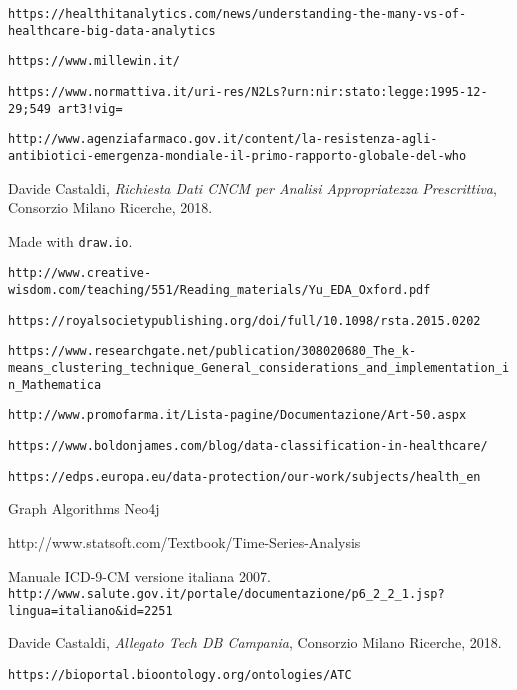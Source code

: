 \begin{thebibliography}{}
	\footnotesize
	
	\texttt{https://healthitanalytics.com/news/understanding-the-many-vs-of-healthcare-big-data-analytics}
	
	\texttt{https://www.millewin.it/}
	
	\texttt{https://www.normattiva.it/uri-res/N2Ls?urn:nir:stato:legge:1995-12-29;549~art3!vig=}
	
	\texttt{http://www.agenziafarmaco.gov.it/content/la-resistenza-agli-antibiotici-emergenza-mondiale-il-primo-rapporto-globale-del-who}
	
	Davide Castaldi, \textit{Richiesta Dati CNCM per Analisi Appropriatezza Prescrittiva}, Consorzio Milano Ricerche, 2018.
	
	Made with \texttt{draw.io}.
	
	\texttt{http://www.creative-wisdom.com/teaching/551/Reading\_materials/Yu\_EDA\_Oxford.pdf}
	
	\texttt{https://royalsocietypublishing.org/doi/full/10.1098/rsta.2015.0202}
	
	\texttt{https://www.researchgate.net/publication/308020680\_The\_k-means\_clustering\_technique\_General\_considerations\_and\_implementation\_in\_Mathematica}
	
	\texttt{http://www.promofarma.it/Lista-pagine/Documentazione/Art-50.aspx}
	
	\texttt{https://www.boldonjames.com/blog/data-classification-in-healthcare/}
	
	\texttt{https://edps.europa.eu/data-protection/our-work/subjects/health\_en}
	
	Graph Algorithms Neo4j
	
	http://www.statsoft.com/Textbook/Time-Series-Analysis
	
	Manuale ICD-9-CM versione italiana 2007. \\
	\texttt{http://www.salute.gov.it/portale/documentazione/p6\_2\_2\_1.jsp?lingua=italiano\&id=2251}
	
	Davide Castaldi, \textit{Allegato Tech DB Campania}, Consorzio Milano Ricerche, 2018.
	
	\texttt{https://bioportal.bioontology.org/ontologies/ATC} 
	

\end{thebibliography}
